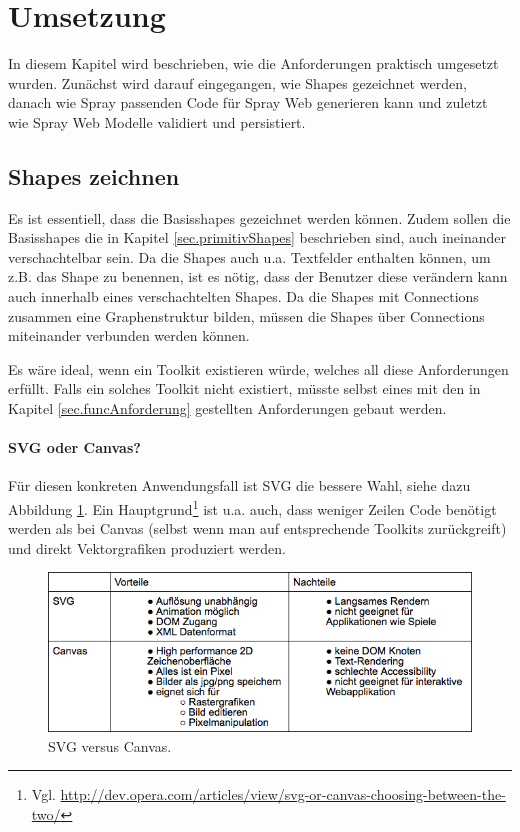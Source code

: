 \section{Umsetzung}

In diesem Kapitel wird beschrieben, wie die Anforderungen praktisch
umgesetzt wurden. Zunächst wird darauf eingegangen, wie Shapes gezeichnet
werden, danach wie Spray passenden Code für Spray Web generieren kann
und zuletzt wie Spray Web Modelle validiert und persistiert.

\subsection{Shapes zeichnen}

Es ist essentiell, dass die Basisshapes gezeichnet werden können.
Zudem sollen die Basisshapes die in Kapitel \ref{sec.primitivShapes}
beschrieben sind, auch ineinander verschachtelbar sein.
Da die Shapes auch u.a. Textfelder enthalten können, um z.B. das Shape
zu benennen, ist es nötig, dass der Benutzer diese verändern kann auch
innerhalb eines verschachtelten Shapes.
Da die Shapes mit Connections zusammen eine Graphenstruktur bilden,
müssen die Shapes über Connections miteinander verbunden werden können.

Es wäre ideal, wenn ein Toolkit existieren würde, welches all diese
Anforderungen erfüllt. Falls ein solches Toolkit nicht existiert,
müsste selbst eines mit den in Kapitel \ref{sec.funcAnforderung}
gestellten Anforderungen gebaut werden.

\paragraph{SVG oder Canvas?} Für diesen konkreten Anwendungsfall ist
SVG die bessere Wahl, siehe dazu Abbildung \ref{fig.svgVsCanvas}.
Ein Hauptgrund\footnote{Vgl. \url{http://dev.opera.com/articles/view/svg-or-canvas-choosing-between-the-two/}} ist u.a. auch, dass weniger Zeilen Code benötigt werden
als bei Canvas (selbst wenn man auf entsprechende Toolkits zurückgreift)
und direkt Vektorgrafiken produziert werden.

\begin{figure}[h!]
  \centering
  \includegraphics[width=1.0\textwidth]{Figures/Svg_vs_Canvas.png}
  \caption{SVG versus Canvas.}\label{fig.svgVsCanvas}
\end{figure}


